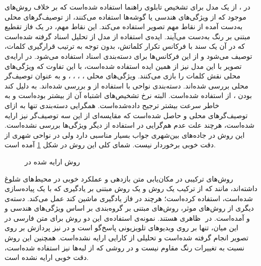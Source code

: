 \documentclass[12pt,a4paper]{article}
\theoremstyle{definition}
\theoremstyle{theorem}
\theoremstyle{definition}
\begin{document}
در \cite{gonzalez1} ، از یک مدل  برای تشخیص تابلوی راهنما استفاده شده‌است که بر خلاف روش‌های موجود که از ویژگی‌های هندسی یا گوشه‌ها استفاده می‌کنند، از توصیف‌گرهای محلی به‌دست آمده از نقاط مهم تصویر استفاده می‌کند. این نقاط مهم، در یک فاز تقطیع مبتنی بر رنگ به‌دست می‌آیند. ایده‌ی استفاده از مدل  از تحلیل اسناد گرفته شده‌است که در آن یک سند با فرکانس تکرار کلماتش، بدون توجه به ترتیب قرارگیری کلمات، توصیف می‌شود و از این فرکانس‌ها برای دسته‌بندی اسناد استفاده می‌شود. در ارایه‌ی تصویر با این مدل نیز از همین ایده استفاده شده‌است، با این تفاوت که ویژگی‌های محلی نقش کلمات را بازی می‌کنند. ویژگی‌های محلی ، ، ، ،  و  \cite{tch} به عنوان توصیف‌گر محلی بررسی شده‌اند. دسته‌بندی نواحی با استفاده از  و  بررسی شده‌اند. به دلیل کند بودن ، از  استفاده شده‌است. البته نرخ تشخیص‌های اشتباه آن از  بیشتر بوده‌است و به خاطر سرعت بیشتر ترجیح داده‌شده‌است. همگرایی دسته‌بندی تنها به ازای توصیف‌گرهای محلی  و  حاصل شده‌است که مقایسه‌ای از این سه توصیف‌گر نیز ارایه شده‌است، هرچند علت عدم‌ هم‌گرایی در استفاده از دیگر ویژگی‌ها بررسی نشده‌است. این روش در جاده‌های بین‌شهری جواب بسیار مناسبی دارد ولی در نواحی شهری از دقت خوبی برخوردار نیست.
شمای کلی این روش در شکل \ref{gonzalez1-pic} آمده است. 
\begin{center}
\begin{figure}[h]
\centering
{}
\caption{روش ارایه شده در \cite{gonzalez1}}
\label{gonzalez1-pic}
\end{figure}
\end{center}
روش‌های ترکیبی در مکان‌یابی متن بازدهی و عملکرد خوبی در محیط‌های شلوغ داشته‌اند، مانند \cite{hybrid} که از ترکیب یک روش   و یک روش مبتنی بر یادگیری  که با یک  پیاده‌سازی شده‌است، استفاده‌ کرده‌است؛ هرچند در فاز یادگیری ماشین کند عمل می‌کند. دسته‌ی دیگری از روش‌های موثر، روش‌های مبتنی بر گروه‌بندی بر اساس ویژگی‌های هندسی و ظاهری هستند\cite{group}. نمونه‌ی استفاده‌ی این دو روش برای متن فارسی در ‎\cite{faVid} و \cite{faAut} آمده‌است. در این میان، \cite{faVid} تنها بر روی ویدیوهای تلویزیونی پاسخ‌گو است و  در \cite{faAut} نیز پردازش بر روی تصویر انجام گرفته‌‌ شده‌است و تحلیلی از کارایی ارایه نشده‌است. همچنین این روش نسبت به تغییرات رنگ مقاوم نیست و در روشی که از لبه‌ها نیز استفاده شده‌است، دقت خوبی ارایه نشده است. 
\end{document}
